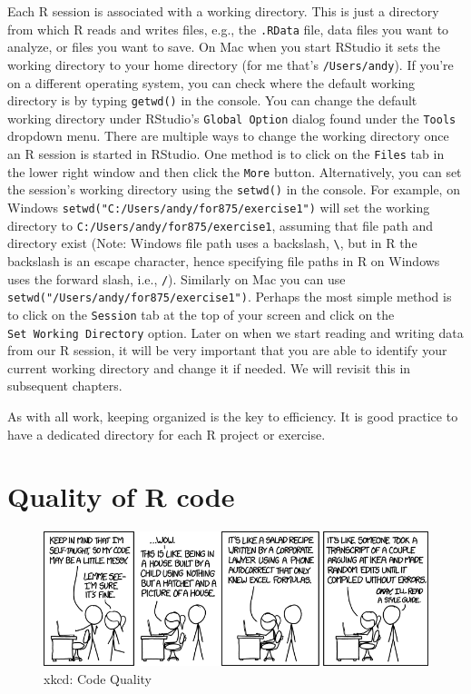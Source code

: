 \documentclass[]{krantz}
\begin{document}
Each R session is associated with a working directory. This is just a
directory from which R reads and writes files, e.g., the \texttt{.RData}
file, data files you want to analyze, or files you want to save. On Mac
when you start RStudio it sets the working directory to your home
directory (for me that's \texttt{/Users/andy}). If you're on a different
operating system, you can check where the default working directory is
by typing \texttt{getwd()} in the console. You can change the default
working directory under RStudio's \verb+Global Option+ dialog found
under the \texttt{Tools} dropdown menu. There are multiple ways to
change the working directory once an R session is started in RStudio.
One method is to click on the \texttt{Files} tab in the lower right
window and then click the \texttt{More} button. Alternatively, you can
set the session's working directory using the \texttt{setwd()} in the
console. For example, on Windows
\texttt{setwd("C:/Users/andy/for875/exercise1")} will set the working
directory to \texttt{C:/Users/andy/for875/exercise1}, assuming that file
path and directory exist (Note: Windows file path uses a backslash,
\texttt{\textbackslash{}}, but in R the backslash is an escape
character, hence specifying file paths in R on Windows uses the forward
slash, i.e., \texttt{/}). Similarly on Mac you can use
\texttt{setwd("/Users/andy/for875/exercise1")}. Perhaps the most simple
method is to click on the \texttt{Session} tab at the top of your screen
and click on the \texttt{Set\ Working\ Directory} option. Later on when
we start reading and writing data from our R session, it will be very
important that you are able to identify your current working directory
and change it if needed. We will revisit this in subsequent chapters.

As with all work, keeping organized is the key to efficiency. It is good
practice to have a dedicated directory for each R project or exercise.

\section{Quality of R code}\label{quality-of-r-code}

\begin{figure}
\includegraphics[width=1\linewidth]{../figures/code_quality} \caption{xkcd: Code Quality}\label{fig:comic}
\end{figure}
\end{document}
